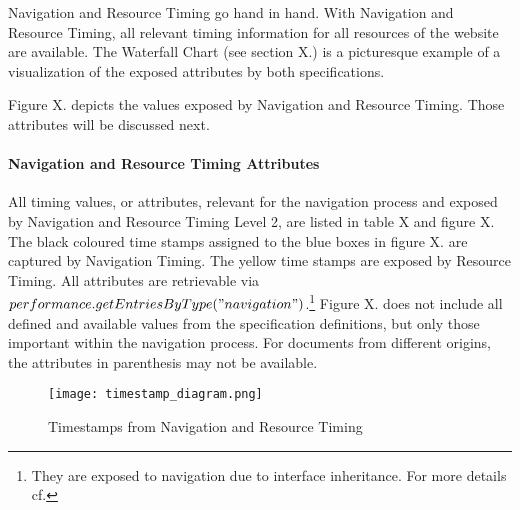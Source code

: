 

Navigation and Resource Timing go hand in hand.
With Navigation and Resource Timing, all relevant timing information for all resources of the website are available.
The Waterfall Chart (see section X.) is a picturesque example of a visualization of the exposed attributes by both specifications.

Figure X. depicts the values exposed by Navigation and Resource Timing.
Those attributes will be discussed next.







\paragraph{Navigation and Resource Timing Attributes}

All timing values, or attributes, relevant for the navigation process and exposed by Navigation and Resource Timing Level 2, are listed in table X and figure X.
The black coloured time stamps assigned to the blue boxes in figure X. are captured by Navigation Timing.
The yellow time stamps are exposed by Resource Timing.
All attributes are retrievable via $performance.getEntriesByType("navigation")$.\footnote{They are exposed to navigation due to interface inheritance. For more details cf. } %
Figure X. does not include all defined and available values from the specification definitions, but only those important within the navigation process.
For documents from different origins, the attributes in parenthesis may not be available.%

\begin{figure}[h!]
\begin{center}
\texttt{[image: timestamp\_diagram.png]}
\caption{Timestamps from Navigation and Resource Timing}
\label{img:latency}
\end{center}
\end{figure}


